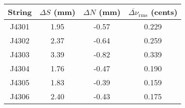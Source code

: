 \begin{tabular}{cccc}
\toprule
String & $\Delta S$ (mm) & $\Delta N$ (mm) & $\overline{\Delta \nu}_\text{rms}$ (cents) \\
\midrule
J4301 & 1.95 & -0.57 & 0.229 \\
J4302 & 2.37 & -0.64 & 0.259 \\
J4303 & 3.39 & -0.82 & 0.339 \\
J4304 & 1.76 & -0.47 & 0.190 \\
J4305 & 1.83 & -0.39 & 0.159 \\
J4306 & 2.40 & -0.43 & 0.175 \\
\bottomrule
\end{tabular}
